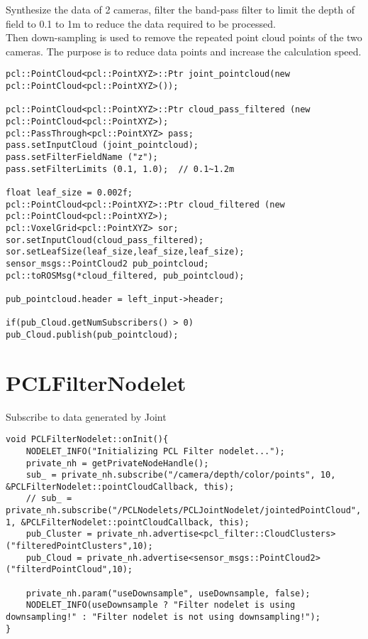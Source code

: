 Synthesize the data of 2 cameras, filter the band-pass filter to limit the depth of field to 0.1 to 1m to reduce the data required to be processed.\\
Then down-sampling is used to remove the repeated point cloud points of the two cameras. The purpose is to reduce data points and increase the calculation speed.
\begin{lstlisting}[caption={}] pcl::PointCloud<pcl::PointXYZ>::Ptr joint_pointcloud(new pcl::PointCloud<pcl::PointXYZ>());

pcl::PointCloud<pcl::PointXYZ>::Ptr cloud_pass_filtered (new pcl::PointCloud<pcl::PointXYZ>);
pcl::PassThrough<pcl::PointXYZ> pass;
pass.setInputCloud (joint_pointcloud);
pass.setFilterFieldName ("z");
pass.setFilterLimits (0.1, 1.0);  // 0.1~1.2m 

float leaf_size = 0.002f;
pcl::PointCloud<pcl::PointXYZ>::Ptr cloud_filtered (new pcl::PointCloud<pcl::PointXYZ>);
pcl::VoxelGrid<pcl::PointXYZ> sor;    
sor.setInputCloud(cloud_pass_filtered);            
sor.setLeafSize(leaf_size,leaf_size,leaf_size);           
sensor_msgs::PointCloud2 pub_pointcloud;
pcl::toROSMsg(*cloud_filtered, pub_pointcloud);

pub_pointcloud.header = left_input->header;

if(pub_Cloud.getNumSubscribers() > 0)
pub_Cloud.publish(pub_pointcloud);
\end{lstlisting}

\section{PCLFilterNodelet}
Subscribe to data generated by Joint
\begin{lstlisting}[caption={}]
void PCLFilterNodelet::onInit(){
	NODELET_INFO("Initializing PCL Filter nodelet...");
	private_nh = getPrivateNodeHandle();
	sub_ = private_nh.subscribe("/camera/depth/color/points", 10, &PCLFilterNodelet::pointCloudCallback, this);
	// sub_ = private_nh.subscribe("/PCLNodelets/PCLJointNodelet/jointedPointCloud", 1, &PCLFilterNodelet::pointCloudCallback, this);
	pub_Cluster = private_nh.advertise<pcl_filter::CloudClusters>("filteredPointClusters",10);
	pub_Cloud = private_nh.advertise<sensor_msgs::PointCloud2>("filterdPointCloud",10);
	
	private_nh.param("useDownsample", useDownsample, false);
	NODELET_INFO(useDownsample ? "Filter nodelet is using downsampling!" : "Filter nodelet is not using downsampling!");
}
\end{lstlisting}



